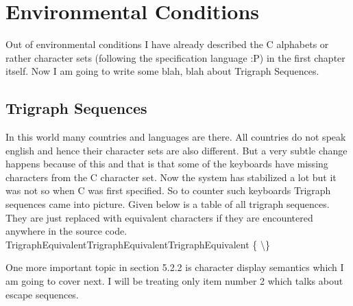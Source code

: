 \section{Environmental Conditions}
Out of environmental conditions I have already described the C
alphabets or rather character sets (following the specification
language :P) in the first chapter itself. Now I am going to write some
blah, blah about Trigraph Sequences.

\subsection{Trigraph Sequences}
In this world many countries and languages are there. All countries do
not speak english and hence their character sets are also
different. But a very subtle change happens because of this and that is
that some of the keyboards have missing characters from the C
character set. Now the system has stabilized a lot but it was not so
when C was first specified. So to counter such keyboards Trigraph
sequences came into picture. Given below is a table of all trigraph
sequences. They are just replaced with equivalent characters if they
are encountered anywhere in the source code.
{\starttable[|c|c|c|c|c|c|]
\HL
\VL Trigraph\VL Equivalent\VL Trigraph\VL Equivalent\VL Trigraph\VL Equivalent\VL\SR
\HL
\VL{}\VL\type{#}\VL{}\VL\type{^}\VL{}\VL\type{|}\VL\FR
\HL
\VL {}\VL\type{[}\VL{}\VL\type{]}\VL {}\VL\{\VL\MR
\HL
\VL {}\VL\backslash\VL{}\VL\}\VL{}\VL\type{~}\VL\LR
\HL
\stoptable}

One more important topic in section 5.2.2 is character display
semantics which I am going to cover next. I will be treating only item
number 2 which talks about escape sequences.
